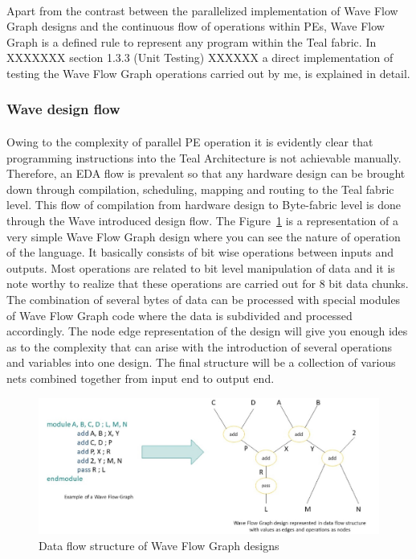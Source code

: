 \paragraph{}
Apart from the contrast between the parallelized implementation of Wave Flow Graph designs and the continuous flow of operations within PEs, Wave Flow Graph is a defined rule to represent any program within the Teal fabric. In XXXXXXX section 1.3.3 (Unit Testing) XXXXXX a direct implementation of testing the Wave Flow Graph operations carried out by me, is explained in detail.

\subsubsection{Wave design flow}
\paragraph{}
Owing to the complexity of parallel PE operation it is evidently clear that programming instructions into the Teal Architecture is not achievable manually. Therefore, an EDA flow is prevalent so that any hardware design can be brought down through compilation, scheduling, mapping and routing to the Teal fabric level. This flow of compilation from hardware design to Byte-fabric level is done through the Wave introduced design flow. The Figure~\ref{Fig:wfgstruct} is a representation of a very simple Wave Flow Graph design where you can see the nature of operation of the language. It basically consists of bit wise operations between inputs and outputs. Most operations are related to bit level manipulation of data and it is note worthy to realize that these operations are carried out for 8 bit data chunks. The combination of several bytes of data can be processed with special modules of Wave Flow Graph code where the data is subdivided and processed accordingly. The node edge representation of the design will give you enough ides as to the complexity that can arise with the introduction of several operations and variables into one design. The final structure will be a collection of various nets combined together from input end to output end.

\begin{figure}[h]
    \centering
    \includegraphics[trim=0cm 0cm 0cm 0cm, clip=true,scale=0.5]{figures/wfg_struct.jpg}
    \caption{Data flow structure of Wave Flow Graph designs\label{Fig:wfgstruct}}\vspace{-4mm}
    \end{figure}